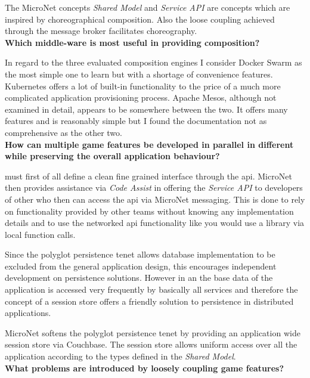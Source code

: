 The MicroNet concepts \textit{Shared Model} and \textit{Service API} are
concepts which are inspired by choreographical composition. Also the loose
coupling achieved through the message broker facilitates choreography.\\

\newpage
\noindent
\textbf{Which middle-ware is most useful in providing \ms{} composition?}

In regard to the three evaluated composition engines I consider Docker Swarm as
the most simple one to learn but with a shortage of convenience features.
Kubernetes offers a lot of built-in functionality to the price of a much more
complicated application provisioning process. Apache Mesos, although not
examined in detail, appears to be somewhere between the two. It offers many
features and is reasonably simple but I found the documentation not as
comprehensive as the other two.\\

\noindent
\textbf{How can multiple game features be developed in parallel in different
\mss{} while preserving the overall application behaviour?}

\mss{} must first of all define a clean fine grained interface through the
\gls{api}. MicroNet then provides assistance via \textit{Code Assist} in
offering the \textit{Service API} to developers of other \mss{} who then can
access the \gls{api} via MicroNet messaging. This is done to rely on
functionality provided by other \ms{} teams without knowing any implementation
details and to use the networked \gls{api} functionality like you would use a
library via local function calls.

Since the polyglot persistence tenet allows database implementation to be
excluded from the general application design, this encourages independent
development on persistence solutions. However in an \og{} the base data of the
application is accessed very frequently by basically all services and therefore
the concept of a session store offers a \ms{} friendly solution to persistence
in distributed applications.

MicroNet softens the polyglot persistence tenet by providing an application wide
session store via Couchbase. The session store allows uniform access over all
the application according to the types defined in the \textit{Shared Model}.\\

\noindent
\textbf{What problems are introduced by loosely coupling game features?}


